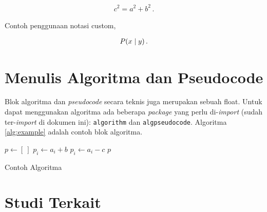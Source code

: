 \begin{align}
	c^2 = a^2 + b^2\,.
	\label{eq:contoh_equation}
\end{align}

Contoh penggunaan notasi custom,

\begin{align}
	P(x \mid y)\,.
	\label{eq:contoh_equation_custom}
\end{align}

\section{Menulis Algoritma dan Pseudocode}

Blok algoritma dan \textit{pseudocode} secara teknis juga merupakan sebuah float. Untuk dapat menggunakan algoritma ada beberapa \textit{package} yang perlu di-\textit{import} (sudah ter-\textit{import} di dokumen ini): \texttt{algorithm} dan \texttt{algpseudocode}. Algoritma \ref{alg:example} adalah contoh blok algoritma.

\begin{algorithm}
	\begin{algorithmic}[1]
		\State $p \gets [~]$
		\State $p_i \gets a_i + b$
		\Else
		\State $p_i \gets a_i - c$
		\EndIf
		\EndFor
		\State \Return $p$
		\EndFunction
	\end{algorithmic}
	\caption{Contoh Algoritma}
	\label{alg:example}
\end{algorithm}

\section{Studi Terkait}
\blindtext
